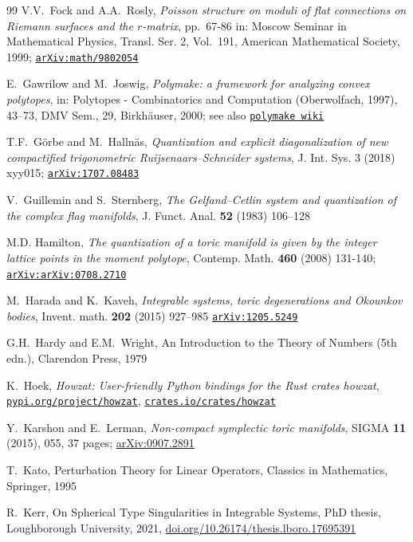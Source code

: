 \documentclass[a4paper,11pt,reqno]{amsart}
\theoremstyle{definition}
\numberwithin{equation}{section}
\begin{document}
\begin{thebibliography}{99}
V.V.~Fock and A.A.~Rosly,
{\it Poisson structure on moduli of flat connections on Riemann surfaces and the $r$-matrix},
pp.~67-86 in: Moscow Seminar in Mathematical Physics,
 Transl. Ser. 2, Vol.~191, American Mathematical Society,  1999;
 \href{https://arxiv.org/abs/math/9802054}{\tt arXiv:math/9802054}


E.~Gawrilow and M.~Joswig, {\it Polymake: a framework for analyzing convex polytopes},
in: Polytopes - Combinatorics and Computation (Oberwolfach, 1997), 43–73, DMV Sem., 29, Birkh\"auser, 2000;
see also \href{https://polymake.org/doku.php/start}{\tt polymake wiki}

T.F.~G\"orbe and M.~Halln\"as,
{\it  Quantization and explicit diagonalization of new compactified trigonometric Ruijsenaars--Schneider systems},
J. Int. Sys. 3 (2018) xyy015;
\href{https://arxiv.org/abs/1707.08483}{\tt arXiv:1707.08483}

V.~Guillemin and S.~Sternberg,
{\it The Gelfand--Cetlin system and quantization of the complex flag manifolds},
J. Funct. Anal. {\bf 52} (1983) 106–128

M.D. Hamilton,
\emph{The quantization of a toric manifold is given by the integer lattice points in
the moment polytope},
Contemp. Math. {\bf 460} (2008)  131-140;
\href{https://arxiv.org/abs/0708.2710}{\tt arXiv:arXiv:0708.2710}


M.~Harada and K.~Kaveh,
{\it Integrable systems, toric degenerations and Okounkov bodies},
Invent. math.  {\bf 202} (2015) 927–985
\href{https://arxiv.org/abs/1205.5249}{\tt arXiv:1205.5249}

G.H.~Hardy and E.M.~Wright,
An Introduction to the Theory of
Numbers (5th edn.), Clarendon Press, 1979

K.~Hoek,
{\it Howzat: User-friendly Python bindings for the Rust crates howzat},
\href{https://pypi.org/project/howzat}{\tt pypi.org/project/howzat},
\href{https://crates.io/crates/howzat}{\tt crates.io/crates/howzat}


Y.~Karshon and E.~Lerman,
{\it Non-compact symplectic toric manifolds},
SIGMA {\bf 11} (2015), 055, 37 pages;
\href{https://arxiv.org/abs/0907.2891}{arXiv:0907.2891}


T.~Kato,
Perturbation Theory for Linear Operators, Classics in Mathematics,
Springer, 1995

R.~Kerr,
On Spherical Type Singularities in Integrable Systems,
PhD thesis, Loughborough University, 2021,
\href{https://doi.org/10.26174/thesis.lboro.17695391}{doi.org/10.26174/thesis.lboro.17695391}


\end{thebibliography}
\end{document}
